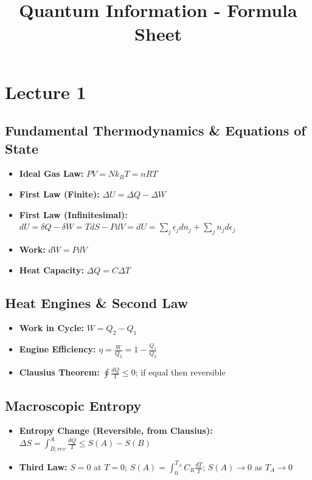 \documentclass[12pt]{article}
\title{Quantum Information - Formula Sheet}
\author{}
\date{}
\begin{document}
\maketitle
\section{Lecture 1}
\subsection*{Fundamental Thermodynamics \& Equations of State}
\begin{itemize}
    \item \textbf{Ideal Gas Law:} $PV = Nk_BT = nRT$
    \item \textbf{First Law (Finite):} $\Delta U = \Delta Q - \Delta W$
    \item \textbf{First Law (Infinitesimal):} $dU = \delta Q - \delta W = TdS - PdV= dU = \sum_j \epsilon_j dn_j + \sum_j n_j d\epsilon_j$
    \item \textbf{Work:} $dW = PdV$
    \item \textbf{Heat Capacity:} $\Delta Q = C \Delta T$
\end{itemize}

\subsection*{Heat Engines \& Second Law}
\begin{itemize}
    \item \textbf{Work in Cycle:} $W = Q_2 - Q_1$
    \item \textbf{Engine Efficiency:} $\eta = \frac{W}{Q_2} = 1 - \frac{Q_1}{Q_2}$
    \item \textbf{Clausius Theorem:} $\oint \frac{dQ}{T} \leq 0$; if equal then reversible
\end{itemize}

\subsection*{Macroscopic Entropy}
\begin{itemize}
    \item \textbf{Entropy Change (Reversible, from Clausius):} $\Delta S = \int^{A}_{B;rev} \frac{dQ}{T}\leq S(A)-S(B)$
    \item \textbf{Third Law:} $S = 0$ at $T = 0$; $S(A)=\int_{0}^{T_{A}} C_{R}\frac{dT}{T}$; $S(A)\rightarrow 0$ as $T_A \rightarrow 0$
\end{itemize}
\end{document}
